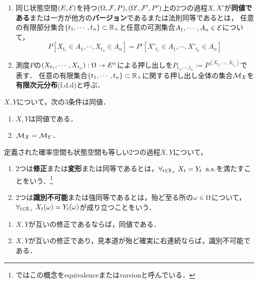 \documentclass[uplatex,dvipdfmx]{jsreport}
\begin{document}
\begin{definition}\mbox{}
    \begin{enumerate}
        \item 同じ状態空間$(E,\mathcal{E})$を持つ$(\Omega,\mathcal{F},P),(\Omega',\mathcal{F}',P')$上の2つの過程$X,X'$が\textbf{同値である}または一方が他方の\textbf{バージョン}であるまたは法則同等\cite{伊藤清確率論}であるとは，
        任意の有限部分集合$\{t_1,\cdots,t_n\}\subset\mathbb{R}_+$と任意の可測集合$A_1,\cdots,A_n\in\mathcal{E}$について，
        \[P[X_{t_1}\in A_1,\cdots,X_{t_n}\in A_n]=P'[X'_{t_1}\in A_1,\cdots,X'_{t_n}\in A_n]\]
        \item 測度$P$の$(X_{t_1},\cdots,X_{t_n}):\Omega\to E^n$による押し出しを$P_{t_1,\cdots,t_n}:=P^{(X_{t_1},\cdots,X_{t_n})}$で表す．
        任意の有限集合$\{t_1,\cdots,t_n\}\subset\mathbb{R}_+$に関する押し出し全体の集合$\mathcal{M}_X$を\textbf{有限次元分布}(f.d.d)と呼ぶ．
    \end{enumerate}
\end{definition}
\begin{lemma}[過程の同値性の特徴付け]
    $X,Y$について，次の3条件は同値．
    \begin{enumerate}
        \item $X,Y$は同値である．
        \item $\mathcal{M}_X=\mathcal{M}_Y$．
    \end{enumerate}
\end{lemma}

\begin{definition}
    定義された確率空間も状態空間も等しい2つの過程$X,Y$について，
    \begin{enumerate}
        \item 2つは\textbf{修正}または\textbf{変形}または同等\cite{伊藤清確率論}であるとは，$\forall_{t\in\mathbb{R}_+}\;X_t=Y_t\;\;\mathrm{a.s.}$を満たすことをいう．\footnote{\cite{Nualart}ではこの概念をequivalenceまたはvarsionと呼んでいる．}
        \item 2つは\textbf{識別不可能}または強同等\cite{伊藤清確率論}であるとは，殆ど至る所の$\omega\in\Omega$について，$\forall_{t\in\mathbb{R}_+}\;X_t(\omega)=Y_t(\omega)$が成り立つことをいう．
    \end{enumerate}
\end{definition}

\begin{lemma}\mbox{}
    \begin{enumerate}
        \item $X,Y$が互いの修正であるならば，同値である．
        \item $X,Y$が互いの修正であり，見本道が殆ど確実に右連続ならば，識別不可能である．
    \end{enumerate}
\end{lemma}
\end{document}
